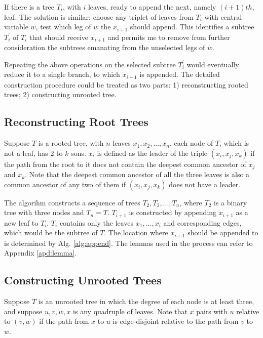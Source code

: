 \documentclass[12pt,a4paper]{article}
\theoremstyle{definition}
\begin{document}
\vspace{0.008\linewidth}
If there is a tree $T_i$, with $i$ leaves, ready to append the next, namely $(i + 1)th$, leaf. The solution is similar: choose any triplet of leaves from $T_i$ with central variable $w$, test which leg of $w$ the $x_{i+1}$ should append. This identifies a subtree $T_i^{'}$ of $T_i$ that should receive $x_{i+1}$ and permits me to remove from further consideration the subtrees emanating from the unselected legs of $w$.

\vspace{0.008\linewidth}
Repeating the above operations on the selected subtree $T_i^{'}$ would eventually reduce it to a single branch, to which $x_{i+1}$ is appended. The detailed construction procedure could be treated as two parts: 1) reconstructing rooted trees; 2) constructing unrooted tree.

\vspace{-0.02\linewidth}
\subsection{Reconstructing Root Trees}

Suppose $T$ is a rooted tree, with $n$ leaves $x_1, x_2, ... , x_n$, each node of $T$, which is not a leaf, has 2 to $k$ sons. $x_i$ is defined as the leader of the triple $(x_i, x_j, x_k)$ if the path from the root to it does not contain the deepest common ancestor of $x_j$ and $x_k$. Note that the deepest common ancestor of all the three leaves is also a common ancestor of any two of them if $(x_i, x_j, x_k)$ does not have a leader.

\vspace{0.008\linewidth}
The algorihm constructs a sequence of trees $T_2, T_3, ... , T_n$, where $T_2$ is a binary tree with three nodes and $T_n=T$. $T_{i+1}$ is constructed by appending $x_{i+1}$ as a new leaf to $T_i$. $T_i$ contains only the leaves $x_1, ... , x_i$ and corresponding edges, which would be the subtree of $T$. The location where $x_{i+1}$ should be appended to is determined by Alg. \ref{alg:append}. The lemmas used in the process can refer to Appendix \ref{apd:lemma}.

\subsection{Constructing Unrooted Trees}

Suppose $T$ is an unrooted tree in which the degree of each node is at least three, and suppose $u, v, w, x$ is any quadruple of leaves. Note that $x$ pairs with $u$ relative to $(v, w)$ if the path from $x$ to $u$ is edge-disjoint relative to the path from $v$ to $w$.
\end{document}
